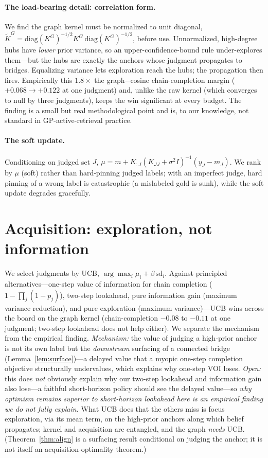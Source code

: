 \documentclass[11pt]{article}
\theoremstyle{plain}\newtheorem{theorem}{Theorem}\newtheorem{lemma}{Lemma}\newtheorem{proposition}{Proposition}
\theoremstyle{definition}\newtheorem{assumption}{Assumption}\newtheorem{remark}{Remark}
\begin{document}
\paragraph{The load-bearing detail: correlation form.} We find the graph kernel must be normalized to unit
diagonal, $\widetilde K^G=\mathrm{diag}(K^G)^{-1/2}K^G\,\mathrm{diag}(K^G)^{-1/2}$, before use. Unnormalized, high-degree
hubs have \emph{lower} prior variance, so an upper-confidence-bound rule under-explores them---but the hubs are
exactly the anchors whose judgment propagates to bridges. Equalizing variance lets exploration reach the hubs; the
propagation then fires. Empirically this $1.8\times$ the graph$-$cosine chain-completion margin ($+0.068\to+0.122$
at one judgment) and, unlike the raw kernel (which converges to null by three judgments), keeps the win
significant at every budget. The finding is a small but real methodological point and is, to our knowledge, not
standard in GP-active-retrieval practice.

\paragraph{The soft update.} Conditioning on judged set $J$, $\mu = m + K_{:J}(K_{JJ}+\sigma^2 I)^{-1}(y_J-m_J)$.
We rank by $\mu$ (soft) rather than hard-pinning judged labels; with an imperfect judge, hard pinning of a wrong
label is catastrophic (a mislabeled gold is sunk), while the soft update degrades gracefully.

\section{Acquisition: exploration, not information}\label{sec:acq}
We select judgments by UCB, $\arg\max_i \mu_i+\beta\,\mathrm{sd}_i$. Against principled alternatives---one-step
value of information for chain completion ($1-\prod_j(1-p_j)$), two-step lookahead, pure information gain (maximum
variance reduction), and pure exploration (maximum variance)---UCB wins across the board on the graph kernel
(chain-completion $-0.08$ to $-0.11$ at one judgment; two-step lookahead does not help either). We separate the
mechanism from the empirical finding. \emph{Mechanism:} the value of judging a high-prior anchor is not its own
label but the \emph{downstream} surfacing of a connected bridge (Lemma~\ref{lem:surface})---a delayed value that a
myopic one-step completion objective structurally undervalues, which explains why one-step VOI loses. \emph{Open:}
this does \emph{not} obviously explain why our two-step lookahead and information gain also lose---a faithful
short-horizon policy should see the delayed value---so \emph{why optimism remains superior to short-horizon
lookahead here is an empirical finding we do not fully explain.} What UCB does that the others miss is focus
exploration, via its mean term, on the high-prior anchors along which belief propagates; kernel and acquisition
are entangled, and the graph \emph{needs} UCB. (Theorem~\ref{thm:align} is a surfacing result conditional on
judging the anchor; it is not itself an acquisition-optimality theorem.)
\end{document}
